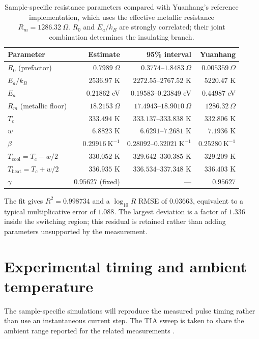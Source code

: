 \documentclass[11pt]{article}
\begin{document}
\begin{table}[H]
\centering
\small
{}
\begin{tabular}{@{}l r r r@{}}
\toprule
Parameter & Estimate & 95\% interval & Yuanhang \\
\midrule
$R_0$ (prefactor) & $0.7989~\Omega$ & $0.3774$--$1.8483~\Omega$ & $0.005359~\Omega$ \\
$E_a/k_B$ & $2536.97$ K & $2272.55$--$2767.52$ K & $5220.47$ K \\
$E_a$ & $0.21862$ eV & $0.19583$--$0.23849$ eV & $0.44987$ eV \\
$R_m$ (metallic floor) & $18.2153~\Omega$ & $17.4943$--$18.9010~\Omega$ & $1286.32~\Omega$ \\
$T_c$ & $333.494$ K & $333.137$--$333.838$ K & $332.806$ K \\
$w$ & $6.8823$ K & $6.6291$--$7.2681$ K & $7.1936$ K \\
$\beta$ & $0.29916~\mathrm{K}^{-1}$ & $0.28092$--$0.32021~\mathrm{K}^{-1}$ & $0.25280~\mathrm{K}^{-1}$ \\
$T_{\mathrm{cool}}=T_c-w/2$ & $330.052$ K & $329.642$--$330.385$ K & $329.209$ K \\
$T_{\mathrm{heat}}=T_c+w/2$ & $336.935$ K & $336.534$--$337.348$ K & $336.403$ K \\
$\gamma$ & $0.95627$ (fixed) & --- & $0.95627$ \\
\bottomrule
\end{tabular}
\caption{Sample-specific resistance parameters compared with Yuanhang's reference implementation, which uses the effective metallic resistance $R_m=1286.32~\Omega$. $R_0$ and $E_a/k_B$ are strongly correlated; their joint combination determines the insulating branch.}
\label{tab:sample_rt_parameters}
\end{table}

The fit gives $R^2=0.998734$ and a $\log_{10}R$ RMSE of $0.03663$, equivalent to a typical multiplicative error of $1.088$. The largest deviation is a factor of $1.336$ inside the switching region; this residual is retained rather than adding parameters unsupported by the measurement.

\section{Experimental timing and ambient temperature}

The sample-specific simulations will reproduce the measured pulse timing rather than use an instantaneous current step. The TIA sweep is taken to share the ambient range reported for the related measurements \cite{gildor2026}.
\end{document}
